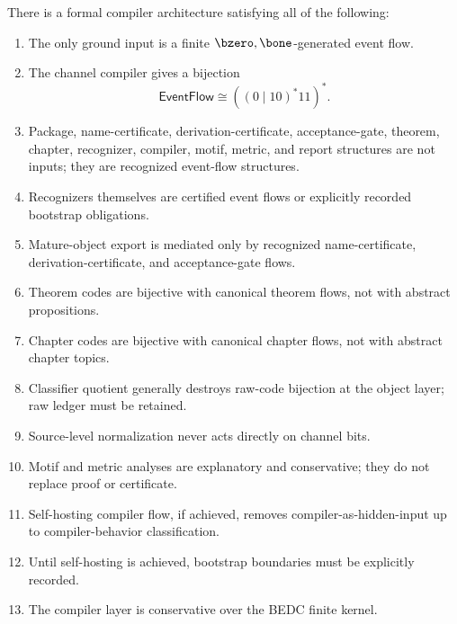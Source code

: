 \begin{theorem}
\label{thm:main-theorems-no-hidden-input-streaming-compiler}
There is a formal compiler architecture satisfying all of the following:
\begin{enumerate}
\item The only ground input is a finite $\bzero,\bone$-generated event flow.
\item The channel compiler gives a bijection
$$
  \mathsf{EventFlow}\cong((0\mid 10)^{\ast}11)^{\ast}.
$$
\item Package, name-certificate, derivation-certificate, acceptance-gate, theorem, chapter, recognizer, compiler, motif, metric, and report structures are not inputs; they are recognized event-flow structures.
\item Recognizers themselves are certified event flows or explicitly recorded bootstrap obligations.
\item Mature-object export is mediated only by recognized name-certificate, derivation-certificate, and acceptance-gate flows.
\item Theorem codes are bijective with canonical theorem flows, not with abstract propositions.
\item Chapter codes are bijective with canonical chapter flows, not with abstract chapter topics.
\item Classifier quotient generally destroys raw-code bijection at the object layer; raw ledger must be retained.
\item Source-level normalization never acts directly on channel bits.
\item Motif and metric analyses are explanatory and conservative; they do not replace proof or certificate.
\item Self-hosting compiler flow, if achieved, removes compiler-as-hidden-input up to compiler-behavior classification.
\item Until self-hosting is achieved, bootstrap boundaries must be explicitly recorded.
\item The compiler layer is conservative over the BEDC finite kernel.
\end{enumerate}
\end{theorem}

